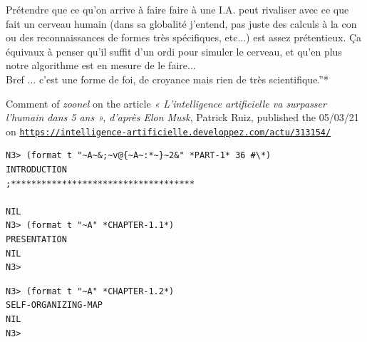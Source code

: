 \documentclass{article}
\begin{document}
\begin{enumerate}[leftmargin=*,label=\underline{\textit{Statement} \arabic*} :]
{Prétendre que ce qu'on arrive à faire faire à une I.A. peut rivaliser avec ce que fait un cerveau humain (dans sa globalité j'entend, pas juste des calculs à la con ou des reconnaissances de formes très spécifiques, etc...) est assez prétentieux. Ça équivaux à penser qu'il suffit d'un ordi pour simuler le cerveau, et qu'en plus notre algorithme est en mesure de le faire...\\ Bref ... c'est une forme de foi, de croyance mais rien de très scientifique.''*}
\begin{spacing}{0.8}
{\footnotesize * Comment of \textsl{zoonel} on the article \textit{« L'intelligence artificielle va surpasser l'humain dans 5 ans », d'après Elon Musk}, Patrick Ruiz, published the 05/03/21 on \href{https://intelligence-artificielle.developpez.com/actu/313154/}{\texttt{\scriptsize https://intelligence-artificielle.developpez.com/actu/313154/}}
}%
\end{spacing}
\end{enumerate}


\begin{spacing}{0.1}
\bigskip
\bigskip
\renewcommand*\contentsname{Contents}
\tableofcontents
\end{spacing}

\bigskip
\bigskip
\renewcommand*\listfigurename{List of figures}
\listoffigures

\bigskip
\bigskip
\renewcommand*{\listtablename}{List of tables}
\listoftables

\bigskip
\bigskip
\bigskip

\begin{lstlisting}[language=sectitle]
N3> (format t "~A~&;~v@{~A~:*~}~2&" *PART-1* 36 #\*)
INTRODUCTION
;************************************

NIL
N3> (format t "~A" *CHAPTER-1.1*)
PRESENTATION
NIL
N3> 
\end{lstlisting}
{}

\bigskip

\bigskip

\begin{lstlisting}[language=sectitle]
N3> (format t "~A" *CHAPTER-1.2*)
SELF-ORGANIZING-MAP
NIL
N3> 
\end{lstlisting}

\bigskip

\bigskip
\end{document}
